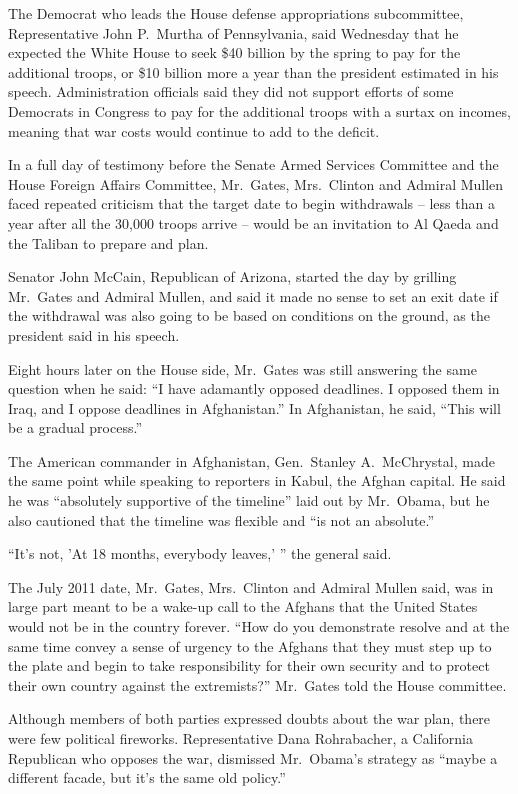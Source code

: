 ﻿\documentclass[12pt]{article}
\begin{document}
The Democrat who leads the House defense appropriations subcommittee, Representative John P.~Murtha
of Pennsylvania, said Wednesday that he expected the White House to seek \$40 billion by the spring
to pay for the additional troops, or \$10 billion more a year than the president estimated in his
speech. Administration officials said they did not support efforts of some Democrats in Congress to
pay for the additional troops with a surtax on incomes, meaning that war costs would continue to add
to the deficit.

In a full day of testimony before the Senate Armed Services Committee and the House Foreign Affairs
Committee, Mr.~Gates, Mrs.~Clinton and Admiral Mullen faced repeated criticism that the target date
to begin withdrawals -- less than a year after all the 30,000 troops arrive -- would be an
invitation to Al Qaeda and the Taliban to prepare and plan.

Senator John McCain, Republican of Arizona, started the day by grilling Mr.~Gates and Admiral
Mullen, and said it made no sense to set an exit date if the withdrawal was also going to be based
on conditions on the ground, as the president said in his speech.

Eight hours later on the House side, Mr.~Gates was still answering the same question when he said:
``I have adamantly opposed deadlines. I opposed them in Iraq, and I oppose deadlines in
Afghanistan.'' In Afghanistan, he said, ``This will be a gradual process.''

The American commander in Afghanistan, Gen.~Stanley A.~McChrystal, made the same point while
speaking to reporters in Kabul, the Afghan capital. He said he was ``absolutely supportive of the
timeline'' laid out by Mr.~Obama, but he also cautioned that the timeline was flexible and ``is not
an absolute.''

``It's not, 'At 18 months, everybody leaves,' '' the general said.

The July 2011 date, Mr.~Gates, Mrs.~Clinton and Admiral Mullen said, was in large part meant to be a
wake-up call to the Afghans that the United States would not be in the country forever. ``How do you
demonstrate resolve and at the same time convey a sense of urgency to the Afghans that they must
step up to the plate and begin to take responsibility for their own security and to protect their
own country against the extremists?'' Mr.~Gates told the House committee.

Although members of both parties expressed doubts about the war plan, there were few political
fireworks. Representative Dana Rohrabacher, a California Republican who opposes the war, dismissed
Mr.~Obama's strategy as ``maybe a different facade, but it's the same old policy.''
\end{document}
